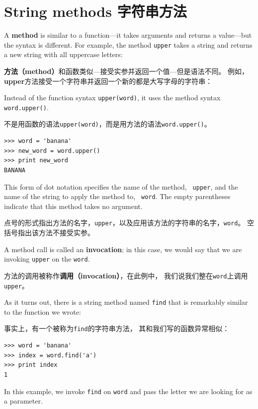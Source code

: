 \documentclass[10pt]{book}
\begin{document}
\begin{CJK}{UTF8}{gbsn}
\begin{exercise}
\end{exercise}


\section{String methods 字符串方法}

A {\bf method} is similar to a function---it takes arguments and
returns a value---but the syntax is different.  For example, the
method {\tt upper} takes a string and returns a new string with
all uppercase letters:

{\bf 方法（method）}和函数类似---接受实参并返回一个值---但是语法不同。
例如，{\bf upper}方法接受一个字符串并返回一个新的都是大写字母的字符串：

Instead of the function syntax {\tt upper(word)}, it uses
the method syntax {\tt word.upper()}.

不是用函数的语法{\tt upper(word)}，而是用方法的语法{\tt word.upper()}。

\begin{verbatim}
>>> word = 'banana'
>>> new_word = word.upper()
>>> print new_word
BANANA
\end{verbatim}
%
This form of dot notation specifies the name of the method, {\tt
upper}, and the name of the string to apply the method to, {\tt
word}.  The empty parentheses indicate that this method takes no
argument.

点号的形式指出方法的名字，{\tt upper}，以及应用该方法的字符串的名字，{\tt word}。
空括号指出该方法不接受实参。

A method call is called an {\bf invocation}; in this case, we would
say that we are invoking {\tt upper} on the {\tt word}.

方法的调用被称作{\bf 调用（invocation）}，在此例中，
我们说我们整在{\tt word}上调用{\tt upper}。

As it turns out, there is a string method named {\tt find} that
is remarkably similar to the function we wrote:

事实上，有一个被称为{\tt find}的字符串方法，
其和我们写的函数异常相似：

\begin{verbatim}
>>> word = 'banana'
>>> index = word.find('a')
>>> print index
1
\end{verbatim}
%
In this example, we invoke {\tt find} on {\tt word} and pass
the letter we are looking for as a parameter.


\end{CJK}
\end{document}
